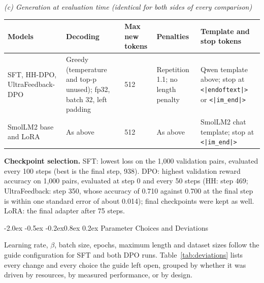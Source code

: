 \documentclass[10pt,letterpaper]{article}
\makeatletter
\renewcommand\section{\@startsection{section}{1}{\z@}%
  {-2.0ex \@plus -0.5ex \@minus -0.2ex}{0.8ex \@plus 0.2ex}%
  {\normalfont\large\bfseries\color{accent}}}
\newcommand{\code}[1]{\texttt{#1}}
\newcommand{\lead}[1]{\textbf{#1}\hspace{0.4em}}
\makeatother
\begin{document}
\begin{table}[htbp]
\vspace{6pt}
\textit{(c) Generation at evaluation time (identical for both sides of every comparison)}\\[2pt]
\begin{tabularx}{\linewidth}{@{}L{2.6cm}L{3.3cm}L{1.6cm}L{2.4cm}Y@{}}
\toprule
\textbf{Models} & \textbf{Decoding} & \textbf{Max new tokens} & \textbf{Penalties} & \textbf{Template and stop tokens} \\
\midrule
SFT, HH-DPO, UltraFeedback-DPO & Greedy (temperature and top-p unused); fp32, batch 32, left padding & 512 & Repetition 1.1; no length penalty & Qwen template above; stop at \code{<|endoftext|>} or \code{<|im\_end|>} \\
SmolLM2 base and LoRA & As above & 512 & As above & SmolLM2 chat template; stop at \code{<|im\_end|>} \\
\bottomrule
\end{tabularx}
\end{table}

\lead{Checkpoint selection.} SFT: lowest loss on the 1,000 validation pairs, evaluated every 100 steps (best is the final step, 938). DPO: highest validation reward accuracy on 1,000 pairs, evaluated at step 0 and every 50 steps (HH: step 469; UltraFeedback: step 350, whose accuracy of 0.710 against 0.700 at the final step is within one standard error of about 0.014); final checkpoints were kept as well. LoRA: the final adapter after 75 steps.

\section{Parameter Choices and Deviations}

Learning rate, $\beta$, batch size, epochs, maximum length and dataset sizes follow the guide configuration for SFT and both DPO runs. Table~\ref{tab:deviations} lists every change and every choice the guide left open, grouped by whether it was driven by resources, by measured performance, or by design.
\end{document}
